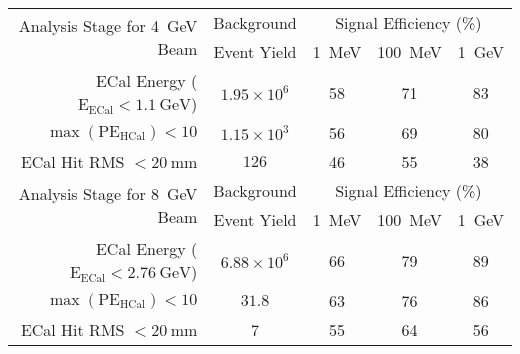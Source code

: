 \begin{tabular}{|r|c||c|c|c|}
    \hline
    \multirow{2}{*}{Analysis Stage for \qty{4}{\GeV} Beam} & 
      Background & 
      \multicolumn{3}{c|}{Signal Efficiency (\%)} 
      \\ \cline{3-5} 
    & Event Yield & \qty{1}{\MeV} & \qty{100}{\MeV} & \qty{1}{\GeV} \\ \hline
    ECal Energy ($\text{E}_{\mathrm{ECal}} < \qty{1.1}{\GeV}$) & 
      $1.95\times10^6$ & 58 & 71 & 83 \\
    $\max(\text{PE}_{\text{HCal}}) < 10$ &
      $1.15\times10^3$ & 56 & 69 & 80 \\
    ECal Hit RMS $< \qty{20}{\mm}$ &
      $126$ & 46 & 55 & 38 \\
    \hline
    \hline
    \multirow{2}{*}{Analysis Stage for \qty{8}{\GeV} Beam} & 
      Background & 
      \multicolumn{3}{c|}{Signal Efficiency (\%)} 
      \\ \cline{3-5} 
    & Event Yield & \qty{1}{\MeV} & \qty{100}{\MeV} & \qty{1}{\GeV} \\ \hline
    ECal Energy ($\text{E}_{\text{ECal}} < \qty{2.76}{\GeV}$) &
      $6.88 \times10^6$ & 66 & 79 & 89 \\
    $\max(\text{PE}_{\text{HCal}}) < 10$ &
      $31.8$ & 63 & 76 & 86 \\
    ECal Hit RMS $< \qty{20}{\mm}$ &
      7 & 55 & 64 & 56 
    \\ \hline
\end{tabular}
